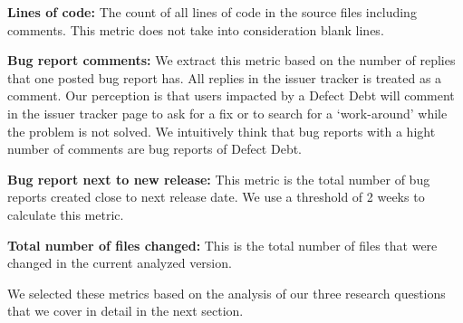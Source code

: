 \textbf{Lines of code:} The count of all lines of code in the source files including comments. This metric does not take into consideration blank lines.

\textbf{Bug report comments:} We extract this metric based on the number of replies that one posted bug report has. All replies in the issuer tracker is treated as a comment. Our perception is that users impacted by a Defect Debt will comment in the issuer tracker page to ask for a fix or to search for a `work-around' while the problem is not solved. We intuitively think that bug reports with a hight number of comments are bug reports of Defect Debt.

\textbf{Bug report next to new release:} This metric is the total number of bug reports created close to next release date. We use a threshold of 2 weeks to calculate this metric.  

\textbf{Total number of files changed:} This is the total number of files that were changed in the current analyzed version. 

 We selected these metrics based on the analysis of our three research questions that we cover in detail in the next section.

